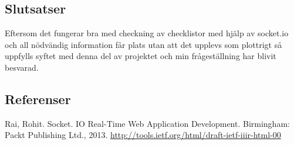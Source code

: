\subsection{Slutsatser}
Eftersom det fungerar bra med checkning av checklistor med hjälp av socket.io och all nödvändig information får plats utan att det upplevs som plottrigt så uppfylls syftet med denna del av projektet och min frågeställning har blivit besvarad.

\subsection{Referenser}
\vspace{-9mm}
\begin{thebibliography}{9}
 Rai, Rohit. Socket. IO Real-Time Web Application Development. Birmingham: Packt Publishing Ltd., 2013.
\url{http://tools.ietf.org/html/draft-ietf-iiir-html-00}
\end{thebibliography}